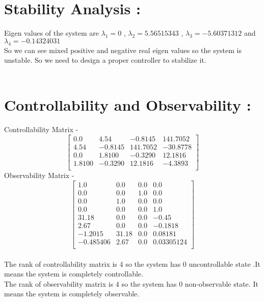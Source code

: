 \documentclass[11pt]{article}
\begin{document}
\section{Stability Analysis :}
{Eigen values of the system are $\lambda_1 = 0$ , $\lambda_2 = 5.56515343$ , $\lambda_3 = -5.60371312$ and $\lambda_4 = -0.14324031$\\}
{So we can see mixed positive and negative real eigen values so the system is unstable.
So we need to design a proper controller to stabilize it.\\\\}
\section{Controllability and Observability :}
{Controllability Matrix - \\}
$$\begin{bmatrix}
0.0&4.54&-0.8145&141.7052\\
4.54&-0.8145&141.7052&-30.8778\\
0.0&1.8100&-0.3290&12.1816\\
1.8100&-0.3290&12.1816&-4.3893\\
\end{bmatrix}$$
{Observability Matrix - \\}
$$\begin{bmatrix}
1.0&0.0&0.0&0.0\\
0.0&0.0&1.0&0.0\\
0.0&1.0&0.0&0.0\\
0.0&0.0&0.0&1.0\\
31.18&0.0&0.0&-0.45\\
2.67&0.0&0.0&-0.1818\\
-1.2015&31.18&0.0&0.08181\\
-0.485406&2.67&0.0&0.03305124\\
\end{bmatrix}$$\\
{The rank of controllability matrix is 4 so the system has 0 uncontrollable state .It means the system is completely controllable. \\
The rank of observability matrix is 4 so the system has 0 non-observable state. It means the system is completely observable.\\\\}
\end{document}
